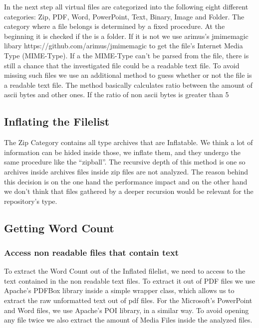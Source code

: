 \documentclass[paper=A4,pagesize=auto,11pt,headinclude=true,footinclude=true,BCOR=0mm,DIV=calc]{scrartcl}
\begin{document}
	In the next step all virtual files are categorized into the following eight different categories: Zip, PDF, Word, PowerPoint, Text, Binary, Image and Folder. The category where a file belongs is determined by a fixed procedure. 
	At the beginning it is checked if the is a folder. If it is not we use arimus’s jmimemagic libary https://github.com/arimus/jmimemagic to get the file’s Internet Media Type (MIME-Type). If a the MIME-Type can’t be parsed from the file, there is still a chance that the investigated file could be a readable text file. To avoid missing such files we use an additional method to guess whether or not the file is a readable text file. The method basically calculates ratio between the amount of ascii bytes and other ones. If the ratio of non ascii bytes is greater than 5%
	
	\subsection{Inflating the Filelist}
	
	The Zip Category contains all type archives that are Inflatable. We think a lot of information can be hided inside those, we inflate them, and they undergo the same procedure like the “zipball”. The recursive depth of this method is one so archives inside archives files inside zip files are not analyzed. The reason behind this decision is on the one hand the performance impact and on the other hand we don’t think that files gathered by a deeper recursion would be relevant for the repository’s type.
	
	\subsection{Getting Word Count}
	
	\subsubsection{ Access non readable files that contain text}
	To extract the Word Count out of the Inflated filelist, we need to access to the text contained in the non readable text files. To extract it out of PDF files we use Apache’s PDFBox library inside a simple wrapper class, which allows us to extract the raw unformatted text out of pdf files. For the Microsoft’s PowerPoint and Word files, we use Apache’s POI library, in a similar way.
	To avoid opening any file twice we also extract the amount of Media Files inside the analyzed files. 
	
\end{document}
